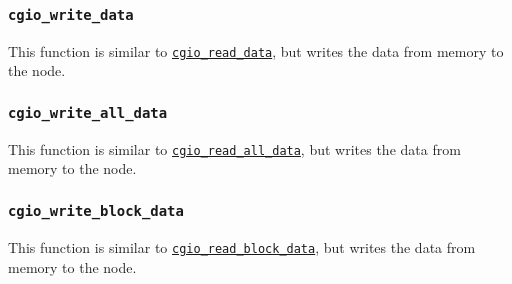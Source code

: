 \subsubsection{\texttt{cgio\_write\_data}} \label{write_data}
    \noindent
    This function is similar to
    \hyperlink{read_data}{\texttt{cgio\_read\_data}},
    but writes the data from memory to the node.

\subsubsection{\texttt{cgio\_write\_all\_data}} \label{write_all_data}
    \noindent
    This function is similar to
    \hyperlink{read_all_data}{\texttt{cgio\_read\_all\_data}},
    but writes the data from memory to the node.

\subsubsection{\texttt{cgio\_write\_block\_data}} \label{write_block_data}
    \noindent
    This function is similar to
    \hyperlink{read_block_data}{\texttt{cgio\_read\_block\_data}},
    but writes the data from memory to the node.

